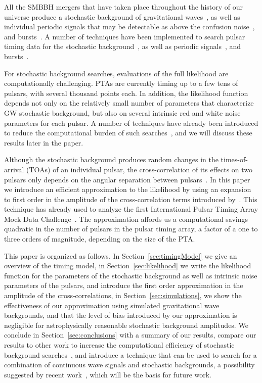 \documentclass[iop]{emulateapj}
\begin{document}
All the SMBBH mergers that have taken place throughout the history of our universe produce a stochastic background of gravitational waves~\citep{lb01,jb03,wl03,vhm03,ein+04,svc08,s13,McWilliams:2012jj}, as well as individual periodic signals that may be detectable as above the confusion noise~\citep{svv09,sv10,rs11,rwh+12,Mingarelli:2012hh}, and bursts~\citep{vl10,Cordes:2012zz}. A number of techniques have been implemented to search pulsar timing data for the stochastic background~\citep{det79,srt+90,l02,jhl+05,jhs+06,abc+09,hlm+09,vlm+09,ych+11,vhj+11,Cordes:2011vg,dfg+12}, as well as periodic signals~\citep{jll+04,yhj+10,cc10,lwk+11, ejm12,bs12,esc12,pbs+12}, and bursts~\citep{fl10}. 

For stochastic background searches, evaluations of the full likelihood are computationally challenging. PTAs are currently timing up to a few tens of pulsars, with several thousand points each. In addition, the likelihood function depends not only on the relatively small number of parameters that characterize GW stochastic background, but also on several intrinsic red and white noise parameters for each pulsar. A number of techniques have already been introduced to reduce the computational burden of such searches~\citep{vh12,Lentati:2012xb,Taylor:2012vx}, and we will discuss these results later in the paper.  

Although the stochastic background produces random changes in the times-of-arrival (TOAs) of an individual pulsar, the cross-correlation
of its effects on two pulsars only depends on the angular separation between pulsars~\citep{hd83}. In this paper we introduce an efficient approximation to the likelihood by using an expansion to first order in the amplitude of the cross-correlation terms introduced by~\cite{abc+09}. This technique has already used to analyze the first International Pulsar Timing Array Mock Data Challenge~\citep{esc12b}. The approximation affords us a computational savings quadratic in the number of pulsars in the pulsar timing array, a factor of a one to three orders of magnitude, depending on the size of the PTA.

This paper is organized as follows. In Section~\ref{sec:timingModel} we give an overview of the timing model, in Section~\ref{sec:likelihood} we write the likelihood function for the parameters of the stochastic background as well as intrinsic noise parameters of the pulsars, and introduce the first order approximation in the amplitude of the cross-correlations, in Section~\ref{sec:simulations}, we show the effectiveness of our approximation using simulated gravitational wave backgrounds, and that the level of bias introduced by our approximation is negligible for astrophysically reasonable stochastic background amplitudes. We conclude in Section~\ref{sec:conclusions} with a summary of our results, compare our results to other work to increase the computational efficiency of stochastic background searches~\citep{vh12,Lentati:2012xb,Taylor:2012vx}, and introduce a technique that can be used to search for a combination of continuous wave signals and stochastic backgrounds, a possibility suggested by recent work~\citep{rwh+12}, which will be the basis for future work.
\end{document}
